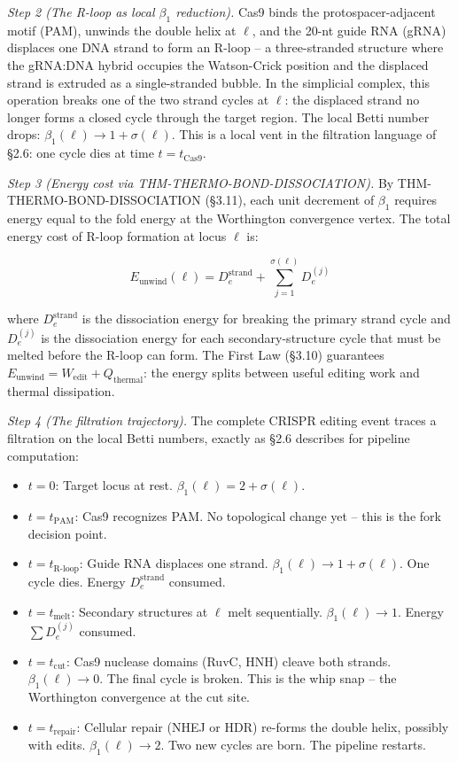 \documentclass[
  11pt,
]{article}
\providecommand{\tightlist}{%
  \setlength{\itemsep}{0pt}\setlength{\parskip}{0pt}}
\begin{document}
\emph{Step 2 (The R-loop as local \(\beta_1\) reduction).} Cas9 binds
the protospacer-adjacent motif (PAM), unwinds the double helix at
\(\ell\), and the 20-nt guide RNA (gRNA) displaces one DNA strand to
form an R-loop -- a three-stranded structure where the gRNA:DNA hybrid
occupies the Watson-Crick position and the displaced strand is extruded
as a single-stranded bubble. In the simplicial complex, this operation
breaks one of the two strand cycles at \(\ell\): the displaced strand no
longer forms a closed cycle through the target region. The local Betti
number drops: \(\beta_1(\ell) \to 1 + \sigma(\ell)\). This is a local
vent in the filtration language of §2.6: one cycle dies at time
\(t = t_{\text{Cas9}}\).

\emph{Step 3 (Energy cost via THM-THERMO-BOND-DISSOCIATION).} By
THM-THERMO-BOND-DISSOCIATION (§3.11), each unit decrement of \(\beta_1\)
requires energy equal to the fold energy at the Worthington convergence
vertex. The total energy cost of R-loop formation at locus \(\ell\) is:

\[E_{\text{unwind}}(\ell) = D_e^{\text{strand}} + \sum_{j=1}^{\sigma(\ell)} D_e^{(j)}\]

where \(D_e^{\text{strand}}\) is the dissociation energy for breaking
the primary strand cycle and \(D_e^{(j)}\) is the dissociation energy
for each secondary-structure cycle that must be melted before the R-loop
can form. The First Law (§3.10) guarantees
\(E_{\text{unwind}} = W_{\text{edit}} + Q_{\text{thermal}}\): the energy
splits between useful editing work and thermal dissipation.

\emph{Step 4 (The filtration trajectory).} The complete CRISPR editing
event traces a filtration on the local Betti numbers, exactly as §2.6
describes for pipeline computation:

\begin{itemize}
\tightlist
\item
  \(t = 0\): Target locus at rest. \(\beta_1(\ell) = 2 + \sigma(\ell)\).
\item
  \(t = t_{\text{PAM}}\): Cas9 recognizes PAM. No topological change yet
  -- this is the fork decision point.
\item
  \(t = t_{\text{R-loop}}\): Guide RNA displaces one strand.
  \(\beta_1(\ell) \to 1 + \sigma(\ell)\). One cycle dies. Energy
  \(D_e^{\text{strand}}\) consumed.
\item
  \(t = t_{\text{melt}}\): Secondary structures at \(\ell\) melt
  sequentially. \(\beta_1(\ell) \to 1\). Energy \(\sum D_e^{(j)}\)
  consumed.
\item
  \(t = t_{\text{cut}}\): Cas9 nuclease domains (RuvC, HNH) cleave both
  strands. \(\beta_1(\ell) \to 0\). The final cycle is broken. This is
  the whip snap -- the Worthington convergence at the cut site.
\item
  \(t = t_{\text{repair}}\): Cellular repair (NHEJ or HDR) re-forms the
  double helix, possibly with edits. \(\beta_1(\ell) \to 2\). Two new
  cycles are born. The pipeline restarts.
\end{itemize}
\end{document}

